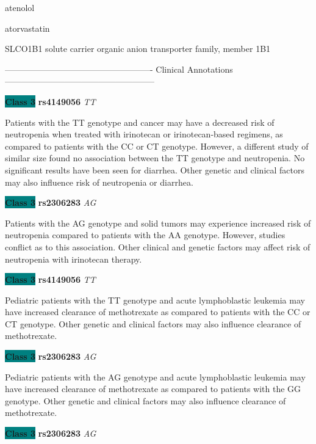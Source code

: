 \documentclass{resume} %
\begin{document}
\begin{rSection}{ atenolol }
\end{rSection}\begin{rSection}{ atorvastatin }
\item[]

\begin{rSubsection}{ SLCO1B1 }{ solute carrier organic anion transporter family, member 1B1 }{}{}
\item[]

\item[] ---------------------------------------------------- Clinical Annotations -----------------------------------------------------\newline
\item \textbf{\colorbox{teal} {Class 3}} \textbf{ rs4149056 } \textit{ TT }
\item[] Patients with the TT genotype and cancer may have a decreased risk of neutropenia when treated with irinotecan or irinotecan-based regimens, as compared to patients with the CC or CT genotype. However, a different study of similar size found no association between the TT genotype and neutropenia. No significant results have been seen for diarrhea. Other genetic and clinical factors may also influence risk of neutropenia or diarrhea.\item \textbf{\colorbox{teal} {Class 3}} \textbf{ rs2306283 } \textit{ AG }
\item[] Patients with the AG genotype and solid tumors may experience increased risk of neutropenia compared to patients with the AA genotype. However, studies conflict as to this association. Other clinical and genetic factors may affect risk of neutropenia with irinotecan therapy.\item \textbf{\colorbox{teal} {Class 3}} \textbf{ rs4149056 } \textit{ TT }
\item[] Pediatric patients with the TT genotype and acute lymphoblastic leukemia may have increased clearance of methotrexate as compared to patients with the CC or CT genotype. Other genetic and clinical factors may also influence clearance of methotrexate.\item \textbf{\colorbox{teal} {Class 3}} \textbf{ rs2306283 } \textit{ AG }
\item[] Pediatric patients with the AG genotype and acute lymphoblastic leukemia may have increased clearance of methotrexate as compared to patients with the GG genotype. Other genetic and clinical factors may also influence clearance of methotrexate. \item \textbf{\colorbox{teal} {Class 3}} \textbf{ rs2306283 } \textit{ AG }

\end{rSubsection}
\end{rSection}
\end{document}
